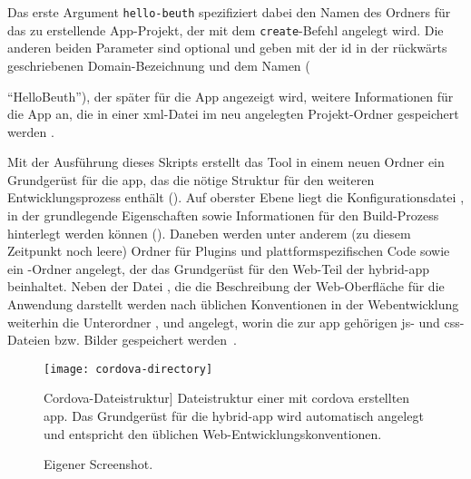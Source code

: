 Das erste Argument \lstinline|hello-beuth| spezifiziert dabei den Namen des Ordners für das zu erstellende App-Projekt, der mit dem \lstinline|create|-Befehl angelegt wird.
Die anderen beiden Parameter sind optional und geben mit der \gls{id} in der rückwärts geschriebenen Domain-Bezeichnung und dem Namen ({\mbox{\enquote{HelloBeuth}}), der später für die App angezeigt wird, weitere Informationen für die App an, die in einer \gls{xml}-Datei im neu angelegten Projekt-Ordner gespeichert werden \cite{Cordova-Docs_CLI}.

Mit der Ausführung dieses Skripts erstellt das Tool in einem neuen Ordner ein Grundgerüst für die \gls{app}, das die nötige Struktur für den weiteren Entwicklungsprozess enthält ().
Auf oberster Ebene liegt die Konfigurationsdatei , in der grundlegende Eigenschaften sowie Informationen für den Build-Prozess hinterlegt werden können ().
Daneben werden unter anderem (zu diesem Zeitpunkt noch leere) Ordner für Plugins und plattformspezifischen Code sowie ein -Ordner angelegt, der das Grundgerüst für den Web-Teil der \gls{hybrid-app} beinhaltet.
Neben der Datei , die die Beschreibung der Web-Oberfläche für die Anwendung darstellt werden nach üblichen Konventionen in der Webentwicklung weiterhin die Unterordner ,  und  angelegt, worin die zur \gls{app} gehörigen \gls{js}- und \gls{css}-Dateien bzw. Bilder gespeichert werden~\cite{Cordova-Docs_CLI}.

\begin{figure}
\centering
\texttt{[image: cordova-directory]}
	\caption
	[Cordova-Dateistruktur]
	{Dateistruktur einer mit \gls{cordova} erstellten \gls{app}. Das Grundgerüst für die \gls{hybrid-app} wird automatisch angelegt und entspricht den üblichen Web-Entwicklungskonventionen.}
	\label{fig:cordova-directory}
		\imagesourcefont
		\vspace{\imagesourcespace}
		\imagesourcefont{}
		\caption*{\imagesourcelabel Eigener Screenshot.}
\end{figure}

\par\noindent\begin{minipage}{\linewidth}

\end{minipage}\par\addvspace{\topskip}

}

